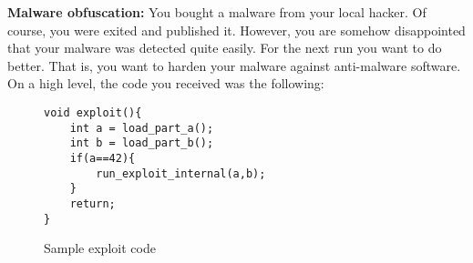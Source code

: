 \documentclass[11pt, a4paper, addpoints, answers]{exam}
\begin{document}
\begin{questions}


\question \textbf{Malware obfuscation:}
You bought a malware from your local hacker. Of course, you were exited and published it. However, you are somehow disappointed that your malware was detected quite easily. For the next run you want to do better. That is, you want to harden your malware against anti-malware software.\\
On a high level, the code you received was the following:
\begin{figure}[H]
\begin{verbatim}
void exploit(){
	int a = load_part_a();
	int b = load_part_b();
	if(a==42){
		run_exploit_internal(a,b);
	}
	return;
}
\end{verbatim}
\caption{Sample exploit code}
\end{figure}
\end{questions}
\end{document}
